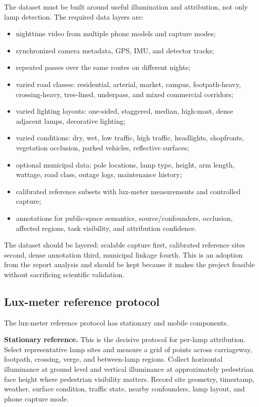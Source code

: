 \documentclass[11pt]{article}
\begin{document}
The dataset must be built around useful illumination and attribution, not only lamp detection. The required data layers are:
\begin{itemize}
  \item nighttime video from multiple phone models and capture modes;
  \item synchronized camera metadata, GPS, IMU, and detector tracks;
  \item repeated passes over the same routes on different nights;
  \item varied road classes: residential, arterial, market, campus, footpath-heavy, crossing-heavy, tree-lined, underpass, and mixed commercial corridors;
  \item varied lighting layouts: one-sided, staggered, median, high-mast, dense adjacent lamps, decorative lighting;
  \item varied conditions: dry, wet, low traffic, high traffic, headlights, shopfronts, vegetation occlusion, parked vehicles, reflective surfaces;
  \item optional municipal data: pole locations, lamp type, height, arm length, wattage, road class, outage logs, maintenance history;
  \item calibrated reference subsets with lux-meter measurements and controlled capture;
  \item annotations for public-space semantics, source/confounders, occlusion, affected regions, task visibility, and attribution confidence.
\end{itemize}

The dataset should be layered: scalable capture first, calibrated reference sites second, dense annotation third, municipal linkage fourth. This is an adoption from the report analysis and should be kept because it makes the project feasible without sacrificing scientific validation.

\subsection{Lux-meter reference protocol}

The lux-meter reference protocol has stationary and mobile components.

\textbf{Stationary reference.} This is the decisive protocol for per-lamp attribution. Select representative lamp sites and measure a grid of points across carriageway, footpath, crossing, verge, and between-lamp regions. Collect horizontal illuminance at ground level and vertical illuminance at approximately pedestrian face height where pedestrian visibility matters. Record site geometry, timestamp, weather, surface condition, traffic state, nearby confounders, lamp layout, and phone capture mode.
\end{document}
